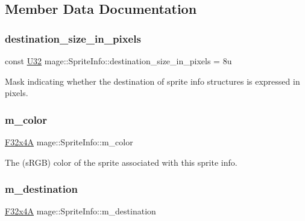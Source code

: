 \subsection{Member Data Documentation}
\hypertarget{structmage_1_1_sprite_info_a84baaa1612a26bcc076965c0997641c3}{}\label{structmage_1_1_sprite_info_a84baaa1612a26bcc076965c0997641c3} 
\subsubsection{\texorpdfstring{destination\+\_\+size\+\_\+in\+\_\+pixels}{destination\_size\_in\_pixels}}
{\footnotesize\ttfamily const \hyperlink{namespacemage_a41c104c036fba3756a74e19f793eeaa1}{U32} mage\+::\+Sprite\+Info\+::destination\+\_\+size\+\_\+in\+\_\+pixels = 8u\hspace{0.3cm}{\ttfamily [static]}}

Mask indicating whether the destination of sprite info structures is expressed in pixels. \hypertarget{structmage_1_1_sprite_info_ac2da3c6930c0682a3854f22a47a9a406}{}\label{structmage_1_1_sprite_info_ac2da3c6930c0682a3854f22a47a9a406} 
\subsubsection{\texorpdfstring{m\+\_\+color}{m\_color}}
{\footnotesize\ttfamily \hyperlink{namespacemage_a0b6ac82244eb3edc5eb66c88a3ddef13}{F32x4A} mage\+::\+Sprite\+Info\+::m\+\_\+color}

The (s\+R\+GB) color of the sprite associated with this sprite info. \hypertarget{structmage_1_1_sprite_info_a297e27f13e1a0cc0d150658e8a0233b9}{}\label{structmage_1_1_sprite_info_a297e27f13e1a0cc0d150658e8a0233b9} 
\subsubsection{\texorpdfstring{m\+\_\+destination}{m\_destination}}
{\footnotesize\ttfamily \hyperlink{namespacemage_a0b6ac82244eb3edc5eb66c88a3ddef13}{F32x4A} mage\+::\+Sprite\+Info\+::m\+\_\+destination}

